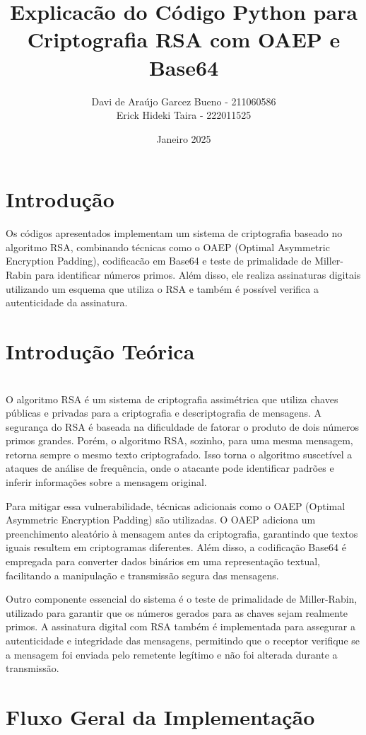 \documentclass{article}
\title{Explicacão do Código Python para Criptografia RSA com OAEP e Base64}
\author{Davi de Araújo Garcez Bueno - 211060586 \\ Erick Hideki Taira - 222011525}
\date{Janeiro 2025}
\begin{document}
\maketitle

\section{Introdução}
Os códigos apresentados implementam um sistema de criptografia baseado no algoritmo RSA, combinando técnicas como o OAEP (Optimal Asymmetric Encryption Padding), 
 codificacão em Base64 e teste de primalidade de Miller-Rabin para identificar números primos. Além disso, ele realiza assinaturas digitais utilizando um esquema que
 utiliza o RSA e também é possível verifica a autenticidade da assinatura.

\section{Introdução Teórica}\\

O algoritmo RSA é um sistema de criptografia assimétrica que utiliza chaves públicas e privadas para a criptografia e descriptografia de mensagens.
A segurança do RSA é baseada na dificuldade de fatorar o produto de dois números primos grandes. Porém, o algoritmo RSA, sozinho, para uma mesma mensagem,
retorna sempre o mesmo texto criptografado. Isso torna o algoritmo suscetível a ataques de análise de frequência,
onde o atacante pode identificar padrões e inferir informações sobre a mensagem original.

Para mitigar essa vulnerabilidade, técnicas adicionais como o OAEP (Optimal Asymmetric Encryption Padding) são utilizadas.
O OAEP adiciona um preenchimento aleatório à mensagem antes da criptografia,
garantindo que textos iguais resultem em criptogramas diferentes.
Além disso, a codificação Base64 é empregada para converter dados binários em uma representação textual,
facilitando a manipulação e transmissão segura das mensagens.

Outro componente essencial do sistema é o teste de primalidade de Miller-Rabin, utilizado para garantir
 que os números gerados para as chaves sejam realmente primos. A assinatura digital com RSA também é
  implementada para assegurar a autenticidade e integridade das mensagens, permitindo que o receptor
   verifique se a mensagem foi enviada pelo remetente legítimo e não foi alterada durante a transmissão.

\section{Fluxo Geral da Implementação}
\end{document}
